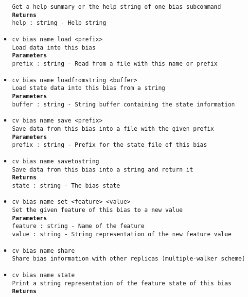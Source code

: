 \begin{itemize}
\texttt{Get a help summary or the help string of one bias subcommand}
\\
\texttt{\textbf{Returns}}
\\
\texttt{help : string - Help string}
\item \texttt{cv bias name load <prefix>}
\\
\texttt{Load data into this bias}
\\
\texttt{\textbf{Parameters}}
\\
\texttt{prefix : string - Read from a file with this name or prefix}
\item \texttt{cv bias name loadfromstring <buffer>}
\\
\texttt{Load state data into this bias from a string}
\\
\texttt{\textbf{Parameters}}
\\
\texttt{buffer : string - String buffer containing the state information}
\item \texttt{cv bias name save <prefix>}
\\
\texttt{Save data from this bias into a file with the given prefix}
\\
\texttt{\textbf{Parameters}}
\\
\texttt{prefix : string - Prefix for the state file of this bias}
\item \texttt{cv bias name savetostring}
\\
\texttt{Save data from this bias into a string and return it}
\\
\texttt{\textbf{Returns}}
\\
\texttt{state : string - The bias state}
\item \texttt{cv bias name set <feature> <value>}
\\
\texttt{Set the given feature of this bias to a new value}
\\
\texttt{\textbf{Parameters}}
\\
\texttt{feature : string - Name of the feature}
\\
\texttt{value : string - String representation of the new feature value}
\item \texttt{cv bias name share}
\\
\texttt{Share bias information with other replicas (multiple-walker scheme)}
\item \texttt{cv bias name state}
\\
\texttt{Print a string representation of the feature state of this bias}
\\
\texttt{\textbf{Returns}}
\\

\end{itemize}
